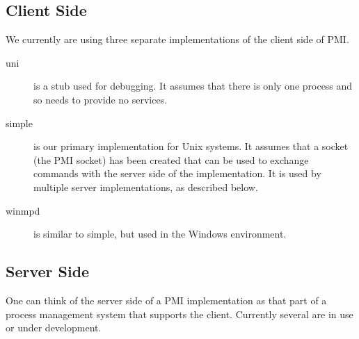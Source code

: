 \documentclass[11pt]{article}
\begin{document}
\subsection{Client Side}
\label{sec:client-side}

We currently are using three separate implementations of the client side of PMI.
\begin{description}
\item[uni] is a stub used for debugging.  It assumes that there is only one
  process and so needs to provide no services.
\item[simple] is our primary implementation for Unix systems.  It
  assumes that a socket (the PMI socket) has been created that can be
  used to exchange commands with the server side of the implementation.
  It is used by multiple server implementations, as described below.
\item[winmpd] is similar to simple, but used in the Windows environment.
\end{description}


\subsection{Server Side}
\label{sec:server-side}

One can think of the server side of a PMI implementation as that part of
a process management system that supports the client.  Currently several
are in use or under development.
\end{document}
